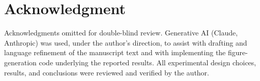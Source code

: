 \documentclass[conference]{IEEEtran}
\begin{document}
\section*{Acknowledgment}
Acknowledgments omitted for double-blind review. Generative AI (Claude, Anthropic) was used, under the author's direction, to assist with drafting and language refinement of the manuscript text and with implementing the figure-generation code underlying the reported results. All experimental design choices, results, and conclusions were reviewed and verified by the author.



\end{document}
